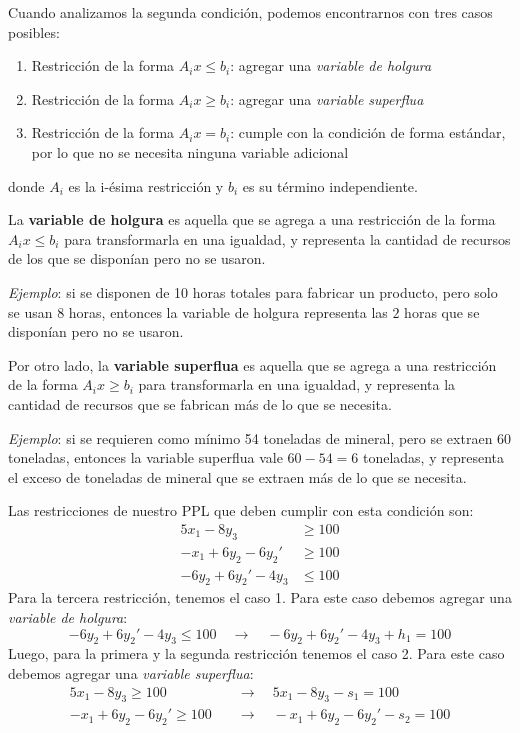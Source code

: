 Cuando analizamos la segunda condición, podemos encontrarnos con tres casos posibles:
\begin{enumerate}
  \item Restricción de la forma \(A_i x \leq b_i\): agregar una \textit{variable de holgura}
  \item Restricción de la forma \(A_i x \geq b_i\): agregar una \textit{variable superflua}
  \item Restricción de la forma \(A_i x = b_i\): cumple con la condición de forma estándar, por lo que no se necesita ninguna variable adicional
\end{enumerate}
\noindent donde \(A_i\) es la i-ésima restricción y \(b_i\) es su término independiente.
\begin{tcolorbox}[remember, title=¿Qué significa variable de holgura y variable superflua?]
  La \textbf{variable de holgura} es aquella que se agrega a una restricción de la forma \(A_i x \leq b_i\) para transformarla en una igualdad, y representa la cantidad de recursos de los que se disponían pero no se usaron. 

  \textit{Ejemplo}: si se disponen de 10 horas totales para fabricar un producto, pero solo se usan 8 horas, entonces la variable de holgura representa las \(2\) horas que se disponían pero no se usaron. 
  
  \vspace{3pt}

  Por otro lado, la \textbf{variable superflua} es aquella que se agrega a una restricción de la forma \(A_i x \geq b_i\) para transformarla en una igualdad, y representa la cantidad de recursos que se fabrican más de lo que se necesita.

  \textit{Ejemplo}: si se requieren como mínimo 54 toneladas de mineral, pero se extraen 60 toneladas, entonces la variable superflua vale \(60 - 54 = 6\) toneladas, y representa el exceso de toneladas de mineral que se extraen más de lo que se necesita. 
\end{tcolorbox}

\noindent Las restricciones de nuestro PPL que deben cumplir con esta condición son:
\begin{align*}
  5x_1 - 8y_3 &\geq 100 \\
  -x_1 + 6y_2 - 6y_2' &\geq 100 \\
  -6y_2 + 6y_2' - 4y_3 &\leq 100
\end{align*}
Para la tercera restricción, tenemos el caso 1. Para este caso debemos agregar una \textit{variable de holgura}:
\[
  -6y_2 + 6y_2' - 4y_3 \leq 100 \quad \rightarrow \quad -6y_2 + 6y_2' - 4y_3 + h_1 = 100
\]
Luego, para la primera y la segunda restricción tenemos el caso 2. Para este caso debemos agregar una \textit{variable superflua}:
\begin{align*}
  5x_1 - 8y_3 \geq 100 \quad &\rightarrow \quad 5x_1 - 8y_3 - s_1 = 100 \\
  -x_1 + 6y_2 - 6y_2' \geq 100 \quad &\rightarrow \quad -x_1 + 6y_2 - 6y_2' - s_2 = 100
\end{align*}

